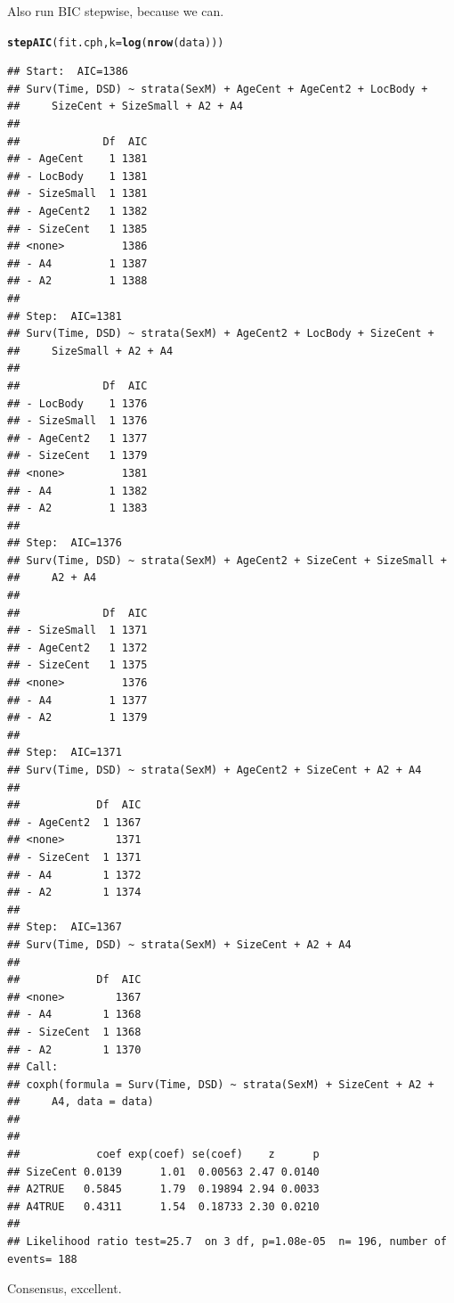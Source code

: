 \documentclass{article}\usepackage[]{graphicx}\usepackage[]{color}
\makeatletter
\newcommand{\hlstd}[1]{\textcolor[rgb]{0.345,0.345,0.345}{#1}}%
\newcommand{\hlkwc}[1]{\textcolor[rgb]{0.333,0.667,0.333}{#1}}%
\newcommand{\hlkwd}[1]{\textcolor[rgb]{0.737,0.353,0.396}{\textbf{#1}}}%
\newenvironment{kframe}{%
 \def\at@end@of@kframe{}%
 \ifinner\ifhmode%
  \def\at@end@of@kframe{\end{minipage}}%
  \begin{minipage}{\columnwidth}%
 \fi\fi%
 \def\FrameCommand##1{\hskip\@totalleftmargin \hskip-\fboxsep
 \colorbox{shadecolor}{##1}\hskip-\fboxsep
     \hskip-\linewidth \hskip-\@totalleftmargin \hskip\columnwidth}%
 \MakeFramed {\advance\hsize-\width
   \@totalleftmargin\z@ \linewidth\hsize
   \@setminipage}}%
 {\par\unskip\endMakeFramed%
 \at@end@of@kframe}
\newenvironment{knitrout}{}{} %
\makeatother
\begin{document}
Also run BIC stepwise, because we can.
\begin{knitrout}
\color{fgcolor}\begin{kframe}
\begin{alltt}
\hlkwd{stepAIC}\hlstd{(fit.cph,} \hlkwc{k} \hlstd{=} \hlkwd{log}\hlstd{(}\hlkwd{nrow}\hlstd{(data)))}
\end{alltt}
\begin{verbatim}
## Start:  AIC=1386
## Surv(Time, DSD) ~ strata(SexM) + AgeCent + AgeCent2 + LocBody + 
##     SizeCent + SizeSmall + A2 + A4
## 
##             Df  AIC
## - AgeCent    1 1381
## - LocBody    1 1381
## - SizeSmall  1 1381
## - AgeCent2   1 1382
## - SizeCent   1 1385
## <none>         1386
## - A4         1 1387
## - A2         1 1388
## 
## Step:  AIC=1381
## Surv(Time, DSD) ~ strata(SexM) + AgeCent2 + LocBody + SizeCent + 
##     SizeSmall + A2 + A4
## 
##             Df  AIC
## - LocBody    1 1376
## - SizeSmall  1 1376
## - AgeCent2   1 1377
## - SizeCent   1 1379
## <none>         1381
## - A4         1 1382
## - A2         1 1383
## 
## Step:  AIC=1376
## Surv(Time, DSD) ~ strata(SexM) + AgeCent2 + SizeCent + SizeSmall + 
##     A2 + A4
## 
##             Df  AIC
## - SizeSmall  1 1371
## - AgeCent2   1 1372
## - SizeCent   1 1375
## <none>         1376
## - A4         1 1377
## - A2         1 1379
## 
## Step:  AIC=1371
## Surv(Time, DSD) ~ strata(SexM) + AgeCent2 + SizeCent + A2 + A4
## 
##            Df  AIC
## - AgeCent2  1 1367
## <none>        1371
## - SizeCent  1 1371
## - A4        1 1372
## - A2        1 1374
## 
## Step:  AIC=1367
## Surv(Time, DSD) ~ strata(SexM) + SizeCent + A2 + A4
## 
##            Df  AIC
## <none>        1367
## - A4        1 1368
## - SizeCent  1 1368
## - A2        1 1370
## Call:
## coxph(formula = Surv(Time, DSD) ~ strata(SexM) + SizeCent + A2 + 
##     A4, data = data)
## 
## 
##            coef exp(coef) se(coef)    z      p
## SizeCent 0.0139      1.01  0.00563 2.47 0.0140
## A2TRUE   0.5845      1.79  0.19894 2.94 0.0033
## A4TRUE   0.4311      1.54  0.18733 2.30 0.0210
## 
## Likelihood ratio test=25.7  on 3 df, p=1.08e-05  n= 196, number of events= 188
\end{verbatim}
\end{kframe}
\end{knitrout}
Consensus, excellent.
\end{document}
